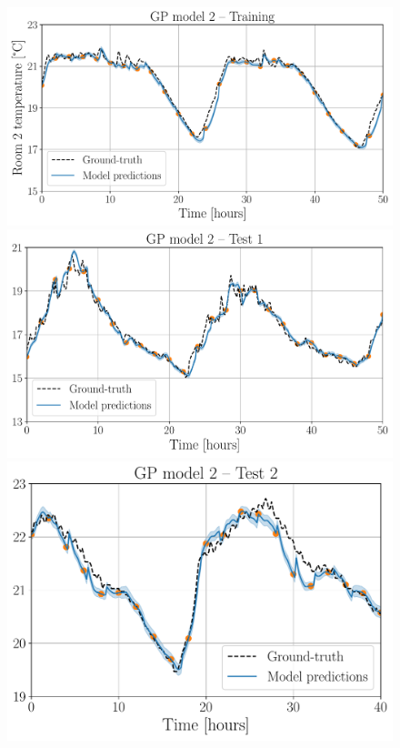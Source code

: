 \begin{figure}[!t]
	\includegraphics[scale=0.29]{../images/chap3_room_2_temp_model_train.pdf}  \\[4pt]
	\includegraphics[scale=0.29]{../images/chap3_room_2_temp_model_test1.pdf}
	\includegraphics[scale=0.29]{../images/chap3_room_2_temp_model_test2.pdf} \\[4pt]

\end{figure}
